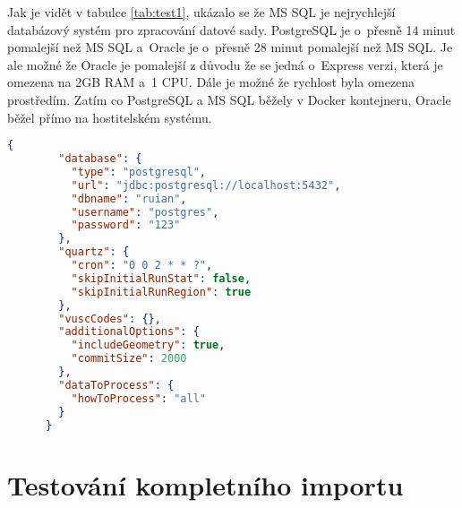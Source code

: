 Jak je vidět v tabulce \ref{tab:test1}, ukázalo se že MS SQL je nejrychlejší databázový systém pro zpracování datové sady.
PostgreSQL je o~přesně 14 minut pomalejší než MS SQL a~Oracle je o~přesně 28 minut pomalejší než MS SQL.
Je ale možné že Oracle je pomalejší z důvodu že se jedná o~Express verzi, která je omezena na 2GB RAM a~1 CPU.
Dále je možné že rychlost byla omezena prostředím. Zatím co PostgreSQL a MS SQL běžely v Docker kontejneru, 
Oracle běžel přímo na hostitelském systému.

\begin{lstlisting}[language=json, caption={Konfigurační soubor pro test rychlosti}, label={lst:konfigTest}]
    {
        "database": {
          "type": "postgresql",
          "url": "jdbc:postgresql://localhost:5432",
          "dbname": "ruian",
          "username": "postgres",
          "password": "123"
        },
        "quartz": {
          "cron": "0 0 2 * * ?",
          "skipInitialRunStat": false,
          "skipInitialRunRegion": true
        },
        "vuscCodes": {},
        "additionalOptions": {
          "includeGeometry": true,
          "commitSize": 2000
        },
        "dataToProcess": {
          "howToProcess": "all"
        }
      }    
\end{lstlisting}


\section{Testování kompletního importu}
